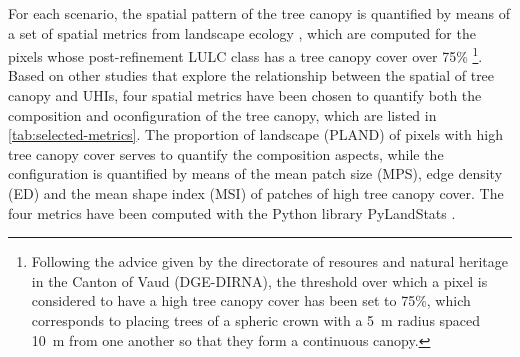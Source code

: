 \documentclass[10pt,letterpaper]{article}
\begin{document}
For each scenario, the spatial pattern of the tree canopy is quantified by means of a set of spatial metrics from landscape ecology \cite{o1988indices,mcgarigal2012fragstats}, which are computed for the pixels whose post-refinement LULC class has a tree canopy cover over 75\% \footnote{Following the advice given by the directorate of resoures and natural heritage in the Canton of Vaud (DGE-DIRNA), the threshold over which a pixel is considered to have a high tree canopy cover has been set to 75\%, which corresponds to placing trees of a spheric crown with a 5~m radius spaced 10~m from one another so that they form a continuous canopy.}.
Based on other studies that explore the relationship between the spatial of tree canopy and UHIs, four spatial metrics have been chosen to quantify both the composition and oconfiguration of the tree canopy, which are listed in \autoref{tab:selected-metrics}. The proportion of landscape (PLAND) of pixels with high tree canopy cover serves to quantify the composition aspects, while the configuration is quantified by means of the mean patch size (MPS), edge density (ED) and the mean shape index (MSI) of patches of high tree canopy cover. The four metrics have been computed with the Python library PyLandStats \cite{bosch2019pylandstats}.
\end{document}
